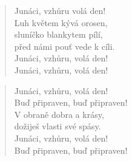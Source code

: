 \begin{song}{}
\begin{verse}
   Junáci, vzhůru volá den! \\
   Luh květem kývá orosen, \\
   sluníčko blankytem pílí, \\
   před námi pouť vede k cíli. \\
   Junáci, vzhůru, volá den! \\
   Junáci, vzhůru, volá den!
\end{verse}
\begin{verse}
   Junáci, vzhůru, volá den! \\
   Buď připraven, buď připraven! \\
   V obraně dobra a krásy, \\
   dožiješ vlasti své spásy. \\
   Junáci, vzhůru, volá den! \\
   Buď připraven, buď připraven!
\end{verse}
\end{song}
